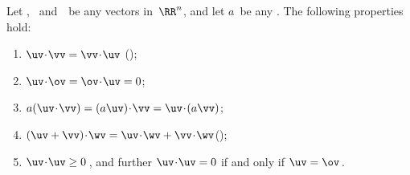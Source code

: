 \begin{theorem} \label{thm:dotops}
Let \uv, \vv\ and~\wv\ be any vectors in~\(\RR^n\), and let \(a\)~be any .
The following properties hold:
\begin{enumerate}
\item\label{thm:dotopsa} \(\uv\cdot\vv=\vv\cdot\uv\) \quad();
\item\label{thm:dotopsc} \(\uv\cdot\ov=\ov\cdot\uv=0\);
\item\label{thm:dotopse} \(a(\uv\cdot\vv)=(a\uv)\cdot\vv=\uv\cdot(a\vv)\);
\item\label{thm:dotopsf} \((\uv+\vv)\cdot\wv=\uv\cdot\wv+\vv\cdot\wv\)\quad();
\item\label{thm:dotopsg} \(\uv\cdot\uv\geq0\)\,, and further \(\uv\cdot\uv=0\) if and only if \(\uv=\ov\)\,.
\end{enumerate}
\end{theorem}


